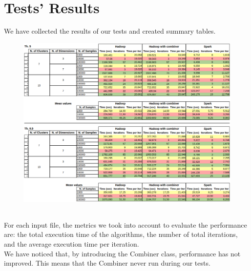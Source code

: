 \documentclass[a4paper, oneside]{article}
\begin{document}
\clearpage

\section{Tests' Results}
We have collected the results of our tests and created summary tables.
\begin{figure}[h]
\centering
\includegraphics[width=1\textwidth]{images/tables}
\end{figure}\\
For each input file, the metrics we took into account to evaluate the performance are: the total execution time of the algorithms, the number of total iterations, and the average execution time per iteration. \\
We have noticed that, by introducing the Combiner class, performance has not improved. This means that the Combiner never run during our tests.
\end{document}

